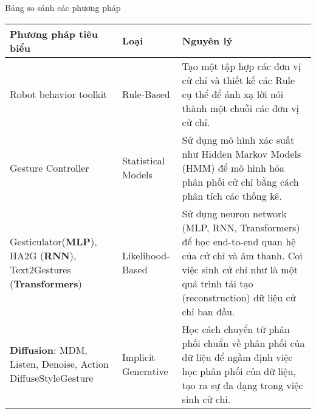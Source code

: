 \begin{frame}{Bảng so sánh các phương pháp}
\begin{table}[h!]
	\footnotesize
	\centering
	\renewcommand{\arraystretch}{1.5} %
	\begin{tabular}{|p{}|p{}|p{}|}
		\hline
		\textbf{Phương pháp tiêu biểu} & \textbf{Loại} & \textbf{Nguyên lý} \\ \hline
		Robot behavior toolkit & Rule-Based & Tạo một tập hợp các đơn vị cử chỉ và thiết kế các Rule cụ thể để ánh xạ lời nói thành một chuỗi các đơn vị cử chỉ. \\ \hline
		Gesture Controller & Statistical Models & Sử dụng mô hình xác suất như Hidden Markov Models (HMM) để mô hình hóa phân phối cử chỉ bằng cách phân tích các thống kê. \\ \hline
		Gesticulator(\textbf{MLP}), HA2G (\textbf{RNN}), Text2Gestures (\textbf{Transformers}) & Likelihood-Based & Sử dụng neuron network  (MLP, RNN, Transformers) để học end-to-end quan hệ của cử chỉ và âm thanh. Coi việc sinh cử chỉ như là một quá trình tái tạo (reconstruction) dữ liệu cử chỉ ban đầu. \\ \hline
		\textbf{Diffusion}: MDM, Listen, Denoise, Action
		DiffuseStyleGesture & Implicit Generative & Học cách chuyển từ phân phối chuẩn về phân phối của dữ liệu để ngầm định việc học phân phối của dữ liệu, tạo ra sự đa dạng trong việc sinh cử chỉ. \\ \hline
	\end{tabular}
\end{table}


\end{frame}

